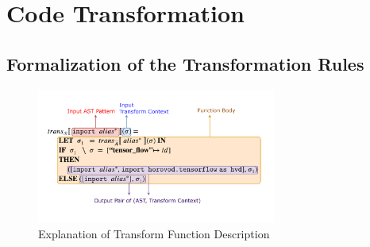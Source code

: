 \section{Code Transformation}\label{sec:trans}

\subsection{Formalization of the Transformation Rules}

% 

\begin{figure}[ht!]
    \centering
    \includegraphics[width=0.7\textwidth]{transfn_expl.pdf}
    \caption{Explanation of Transform Function Description}
    \label{fig:trans:fnexpl}
\end{figure}

